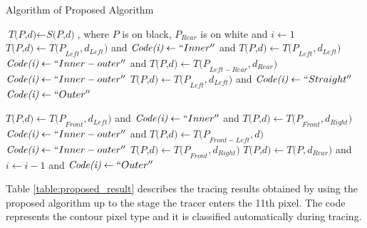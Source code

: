 \begin{algorithm}
\caption{Algorithm of Proposed Algorithm}
\label{alg:proposed}
\begin{algorithmic}[1]
\State $\textit{T(P,d)} \gets \textit{S(P,d)}$, where $P$ is on black, $P_{Rear}$ is on white and $i \gets 1$
\Do
{}
		\State $\textit{T(P,d)} \gets \textit{T(P}_{Left},\textit{d}_{Left} )  $ and $\textit{Code(i)} \gets ``Inner''$ and $\textit{T(P,d)} \gets \textit{T(P}_{Left}, \textit{d}_{Left})$
	\Else
		\State $\textit{Code(i)} \gets ``Inner-outer''$ and $\textit{T(P,d)} \gets \textit{T(P}_{Left-Rear},\textit{d}_{Rear} )  $
		\State $\textit{Code(i)} \gets ``Inner-outer''$
	\EndIf
\Else
		\State $\textit{T(P,d)} \gets \textit{T(P}_{Left},\textit{d}_{Left} )  $ and $\textit{Code(i)} \gets ``Straight''$
	\Else
		\State $\textit{Code(i)} \gets ``Outer''$
	\EndIf
\EndIf


		\State $\textit{T(P,d)} \gets \textit{T(P}_{Front},\textit{d}_{Left} )  $ and $\textit{Code(i)} \gets ``Inner''$ and $\textit{T(P,d)} \gets \textit{T(P}_{Front}, \textit{d}_{Right})$
	\Else
		\State $\textit{Code(i)} \gets ``Inner-outer''$ and $\textit{T(P,d)} \gets \textit{T(P}_{Front-Left},\textit{d} )  $
		\State $\textit{Code(i)} \gets ``Inner-outer''$
	\EndIf
{}
	\State $\textit{T(P,d)} \gets \textit{T(P}_{Front},\textit{d}_{Right} )  $
\Else
	\State $\textit{T(P,d)} \gets \textit{T(P},\textit{d}_{Rear} )  $ and $i \gets i-1$ and $\textit{Code(i)} \gets ``Outer''$
\EndIf


\EndProcedure
\end{algorithmic}
\end{algorithm}

Table \ref{table:proposed_result} describes the tracing results obtained by using the proposed algorithm up to the stage the tracer enters the 11th pixel. The code represents the contour pixel type and it is classified automatically during tracing. 

